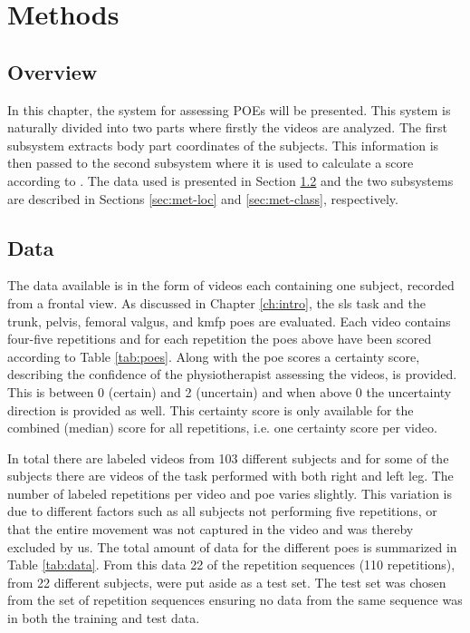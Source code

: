 \chapter{Methods} \label{ch:method}
\section{Overview}
In this chapter, the system for assessing POEs will be presented. This system is naturally divided into two parts where firstly the videos are analyzed. The first subsystem extracts body part coordinates of the subjects. This information is then passed to the second subsystem where it is used to calculate a score according to \cite{Nae2020b}. The data used is presented in Section \ref{sec:met-data} and the two subsystems are described in Sections \ref{sec:met-loc} and \ref{sec:met-class}, respectively.

\section{Data}\label{sec:met-data}
The data available is in the form of videos each containing one subject, recorded from a frontal view. As discussed in Chapter \ref{ch:intro}, the \gls{sls} task and the trunk, pelvis, femoral valgus, and \gls{kmfp} \glspl{poe} are evaluated. Each video contains four-five repetitions and for each repetition the \glspl{poe} above have been scored according to Table \ref{tab:poes}. Along with the \gls{poe} scores a certainty score, describing the confidence of the physiotherapist assessing the videos, is provided. This is between 0 (certain) and 2 (uncertain) and when above 0 the uncertainty direction is provided as well. This certainty score is only available for the combined (median) score for all repetitions, i.e. one certainty score per video.

In total there are labeled videos from 103 different subjects and for some of the subjects there are videos of the task performed with both right and left leg. The number of labeled repetitions per video and \gls{poe} varies slightly. This variation is due to different factors such as all subjects not performing five repetitions, or that the entire movement was not captured in the video and was thereby excluded by us. The total amount of data for the different \glspl{poe} is summarized in Table \ref{tab:data}. From this data 22 of the repetition sequences (110 repetitions), from 22 different subjects, were put aside as a test set. The test set was chosen from the set of repetition sequences ensuring no data from the same sequence was in both the training and test data.

